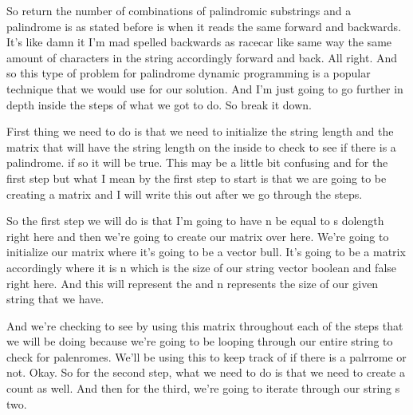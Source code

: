 \expandafter\def\csname sourceexcerpt@31\endcsname{%
So return the number of combinations of palindromic substrings and a palindrome is as
stated before is when it reads the same forward and backwards. It's like damn it I'm
mad spelled backwards as racecar like same way the same amount of characters
in the string accordingly forward and back. All right. And so this type of problem for
palindrome dynamic programming is a popular technique that we would use for our
solution. And I'm just going to go further in depth inside the steps of what we got to
do. So break it down.

First thing we need to do is that we need to initialize the string length and the
matrix that will have the string length on the inside to check to see if there is a
palindrome. if so it will be true. This may be a little bit confusing and for the
first step but what I mean by the first step to start is that we are going to be
creating a matrix and I will write this out after we go through the steps.

So the first step we will do is that I'm going to have n be equal to s dolength right
here and then we're going to create our matrix over here. We're going to initialize
our matrix where it's going to be a vector bull. It's going to be a matrix accordingly
where it is n which is the size of our string vector boolean and false right here. And
this will represent the and n represents the size of our given string that we have.

And we're checking to see by using this matrix throughout each of the steps that we
will be doing because we're going to be looping through our entire string to check for
palenromes. We'll be using this to keep track of if there is a palrrome or not. Okay.
So for the second step, what we need to do is that we need to create a count as well.
And then for the third, we're going to iterate through our string s two.
}

